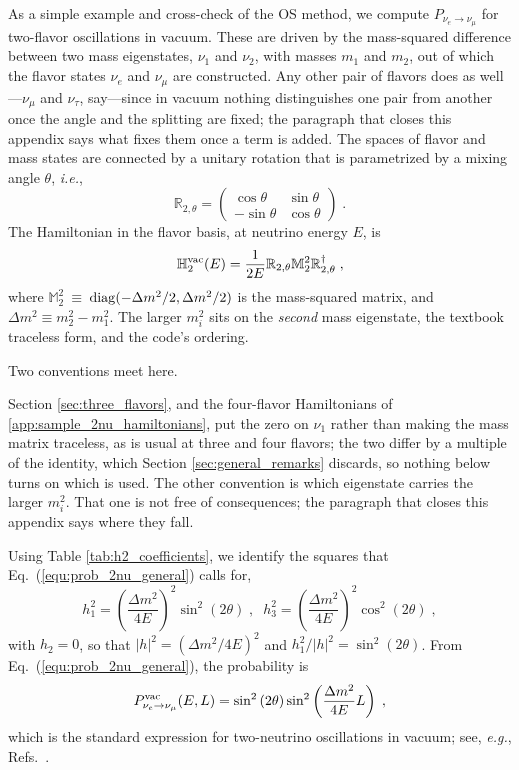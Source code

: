 \documentclass[final,5p,times,twocolumn,sort,compress]{elsarticle}
\newcommand{\ie}{{\it i.e.}}
\newcommand{\eg}{{\it e.g.}}
\newcommand{\eq}{Eq.}
\newcommand{\Refs}{Refs.}
\newcommand{\equ}[1]{\eq~(\ref{equ:#1})}
\begin{document}
As a simple example and cross-check of the OS method, we compute $P_{\nu_e \to \nu_\mu}$ for two-flavor oscillations in vacuum.  These are driven by the mass-squared difference between two mass eigenstates, $\nu_1$ and $\nu_2$, with masses $m_1$ and $m_2$, out of which the flavor states $\nu_e$ and $\nu_\mu$ are constructed.  Any other pair of flavors does as well---$\nu_\mu$ and $\nu_\tau$, say---since in vacuum nothing distinguishes one pair from another once the angle and the splitting are fixed; the paragraph that closes this appendix says what fixes them once a term is added.  The spaces of flavor and mass states are connected by a unitary rotation that is parametrized by a mixing angle $\theta$, \ie,
\begin{equation}
 \label{equ:u_rotation_2nu}
 \mathbb{R}_{2,\theta}
 =
 \left(\begin{array}{cc}
  \cos \theta  & \sin \theta \\
  -\sin \theta & \cos \theta 
 \end{array}\right) \;.
\end{equation}
The Hamiltonian in the flavor basis, at neutrino energy $E$, is
\begin{equation}
 \label{equ:h2_vacuum}
 \mathbb{H}_2^{\rm vac}(E)
 =
 \frac{1}{2E}
 \mathbb{R}_{2,\theta}
 \mathbb{M}_2^2
 \mathbb{R}_{2,\theta}^\dagger \;,
\end{equation}
where $\mathbb{M}_2^2~\equiv~$${\rm diag}(-\Delta m^2/2, \Delta m^2/2)$ is the mass-squared matrix, and $\Delta m^2\equiv m_2^2-m_1^2$.  The larger $m_i^2$ sits on the \emph{second} mass eigenstate, the textbook traceless form, and the code's ordering.

Two conventions meet here.

Section \ref{sec:three_flavors}, and the four-flavor Hamiltonians of \ref{app:sample_2nu_hamiltonians}, put the zero on $\nu_1$ rather than making the mass matrix traceless, as is usual at three and four flavors; the two differ by a multiple of the identity, which Section \ref{sec:general_remarks} discards, so nothing below turns on which is used.  The other convention is which eigenstate carries the larger $m_i^2$.  That one is not free of consequences; the paragraph that closes this appendix says where they fall.

Using Table \ref{tab:h2_coefficients}, we identify the squares that \equ{prob_2nu_general} calls for,
\begin{equation}
 h_1^2 = \left(\frac{\Delta m^2}{4E}\right)^2 \sin^2\left(2\theta\right) \;, \;\;
 h_3^2 = \left(\frac{\Delta m^2}{4E}\right)^2 \cos^2\left(2\theta\right) \;,
\end{equation}
with $h_2 = 0$, so that $\lvert h \rvert^2 = \left(\Delta m^2/4E\right)^2$ and $h_1^2 / \lvert h \rvert^2  = \sin^2\left(2\theta\right)$.  From \equ{prob_2nu_general}, the probability is
\begin{equation}
 P_{\nu_e \to \nu_\mu}^{\rm vac} (E, L)
 =
 \sin^2 \left(2\theta\right)
 \sin^2\left(\frac{\Delta m^2}{4E}L\right) \;,
\end{equation}
which is the standard expression for two-neutrino oscillations in vacuum; see, \eg, \Refs\ \cite{Giunti:2007ry, Tanabashi:2018oca}.
\end{document}
